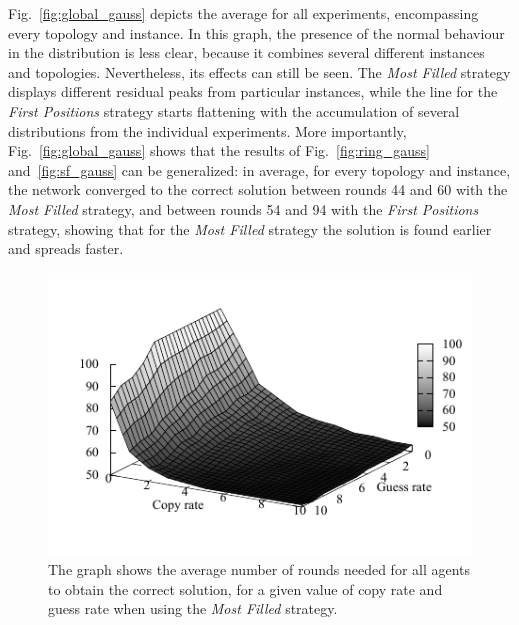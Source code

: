 \documentclass{article}
\begin{document}
Fig.~\ref{fig:global_gauss} depicts the average for all experiments, encompassing every topology and instance. In this graph, the presence of the normal behaviour in the distribution is less clear, because it combines several different instances and topologies. Nevertheless, its effects can still be seen. The \emph{Most Filled} strategy displays different residual peaks from particular instances, while the line for the \emph{First Positions} strategy starts flattening with the accumulation of several distributions from the individual experiments. More importantly, 
Fig.~\ref{fig:global_gauss} shows that the results of Fig.~\ref{fig:ring_gauss} and~\ref{fig:sf_gauss} can be generalized: in average, for every topology and instance, the network converged to the correct solution between rounds 44 and 60 with the \emph{Most Filled} strategy, and between rounds 54 and 94 with the \emph{First Positions} strategy, showing that for the \emph{Most Filled} strategy the solution is found earlier and spreads faster.

\begin{figure}
\includegraphics[scale=1]{ijcai_sudoku/fill_iter}
\caption{The graph shows the average number of rounds needed for all agents to obtain the correct solution, for a given value of copy rate and guess rate when using the \emph{Most Filled} strategy.
}
\label{fig:fill_iter}
\end{figure}
\end{document}
